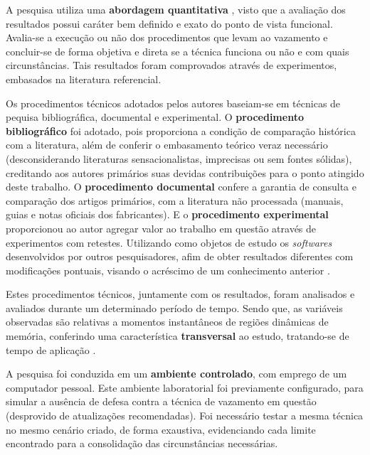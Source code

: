 \documentclass[
	article,			    %
	12pt,				    %
	oneside,			    %
	a4paper,			    %
	chapter=TITLE,		    %
	section=TITLE,		    %
	subsection=TITLE,	    %
	english,			    %
	brazil,				    %
	sumario=tradicional
]{abntex2}
\begin{document}
A pesquisa utiliza uma \textbf{abordagem quantitativa} \cite{Rocha2016Dom}, visto que a avaliação dos resultados possui caráter bem definido e exato do ponto de vista funcional. Avalia-se a execução ou não dos procedimentos que levam ao vazamento e concluir-se de forma objetiva e direta se a técnica funciona ou não e com quais circunstâncias. Tais resultados foram comprovados através de experimentos, embasados na literatura referencial.

Os procedimentos técnicos adotados pelos autores baseiam-se em técnicas de pequisa bibliográfica, documental e experimental. O \textbf{procedimento bibliográfico} foi adotado, pois proporciona a condição de comparação histórica com a literatura, além de conferir o embasamento teórico veraz necessário (desconsiderando literaturas sensacionalistas, imprecisas ou sem fontes sólidas), creditando aos autores primários suas devidas contribuições para o ponto atingido deste trabalho. O \textbf{procedimento documental} confere a garantia de consulta e comparação dos artigos primários, com a literatura não processada (manuais, guias e notas oficiais dos fabricantes). E o \textbf{procedimento experimental} proporcionou ao autor agregar valor ao trabalho em questão através de experimentos com retestes. Utilizando como objetos de estudo os \emph{softwares} desenvolvidos por outros pesquisadores, afim de obter resultados diferentes com modificações pontuais, visando o acréscimo de um conhecimento anterior \cite{Praca2015Metodologia}.

Estes procedimentos técnicos, juntamente com os resultados, foram analisados e avaliados durante um determinado período de tempo. Sendo que, as variáveis observadas são relativas a momentos instantâneos de regiões dinâmicas de memória, conferindo uma característica \textbf{transversal} ao estudo, tratando-se de tempo de aplicação \cite{Setia2016Methodology}.

A pesquisa foi conduzida em um \textbf{ambiente controlado}, com emprego de um computador pessoal. Este ambiente laboratorial foi previamente configurado, para simular a ausência de defesa contra a técnica de vazamento em questão (desprovido de atualizações recomendadas). Foi necessário testar a mesma técnica no mesmo cenário criado, de forma exaustiva, evidenciando cada limite encontrado para a consolidação das circunstâncias necessárias.

\end{document}
